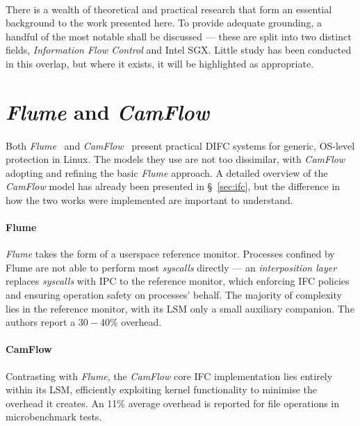 \paragraph{} There is a wealth of theoretical and practical research that form an essential background to the work presented here. To provide adequate grounding, a handful of the most notable shall be discussed --- these are split into two distinct fields, \textit{Information Flow Control} and Intel SGX. Little study has been conducted in this overlap, but where it exists, it will be highlighted as appropriate.


\section{\textit{Flume} and \textit{CamFlow}}

\paragraph{} Both \textit{Flume}~\cite{flume} and \textit{CamFlow}~\cite{camflow} present practical DIFC systems for generic, OS-level protection in Linux. The models they use are not too dissimilar, with \textit{CamFlow} adopting and refining the basic \textit{Flume} approach. A detailed overview of the \textit{CamFlow} model has already been presented in §~\ref{sec:ifc}, but the difference in how the two works were implemented are important to understand.

\paragraph{Flume} \textit{Flume} takes the form of a userspace reference monitor. Processes confined by Flume are not able to perform most \textit{syscalls} directly --- an \textit{interposition layer} replaces \textit{syscalls} with IPC to the reference monitor, which enforcing IFC policies and ensuring operation safety on processes' behalf. The majority of complexity lies in the reference monitor, with its LSM only a small auxiliary companion. The authors report a $30-40$\% overhead.

\paragraph{CamFlow} Contrasting with \textit{Flume}, the \textit{CamFlow} core IFC implementation lies entirely within its LSM, efficiently exploiting kernel functionality to minimise the overhead it creates. An 11\% average overhead is reported for file operations in microbenchmark tests.


